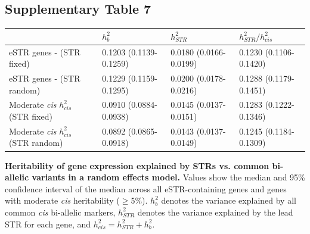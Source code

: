 \subsection{Supplementary Table 7}
\label{tab:estrsuptab7}
\begin{table}[h!]
\begin{adjustbox}{width=1\textwidth}
\begin{tabular}{l|l|l|l}
 & $h^2_{b}$ & $h^2_{STR}$ & $h^2_{STR}/h^2_{cis}$ \\
\hline
 eSTR genes - (STR fixed) & 0.1203 (0.1139-0.1259) & 0.0180 (0.0166-0.0199) & 0.1230 (0.1106-0.1420) \\
 eSTR genes - (STR random) & 0.1229 (0.1159-0.1295) & 0.0200 (0.0178-0.0216) & 0.1288 (0.1179-0.1451) \\
\hline
 Moderate \emph{cis} $h^2_{cis}$ (STR fixed) & 0.0910 (0.0884-0.0938) & 0.0145 (0.0137-0.0151) & 0.1283 (0.1222-0.1346) \\
 Moderate \emph{cis} $h^2_{cis}$ (STR random) & 0.0892 (0.0865-0.0918) & 0.0143 (0.0137-0.0149) & 0.1245 (0.1184-0.1309) \\
\hline
\end{tabular}
\end{adjustbox}
\end{table}
\textbf{Heritability of gene expression explained by STRs vs. common bi-allelic variants in a random effects model.} Values show the median and 95\% confidence interval of the median across all eSTR-containing genes and genes with moderate \emph{cis} heritability ($\geq$5\%). $h^2_{b}$ denotes the variance explained by all common \emph{cis} bi-allelic markers, $h^2_{STR}$ denotes the variance explained by the lead STR for each gene, and $h^2_{cis} = h^2_{STR} + h^2_{b}$.


\pagebreak
